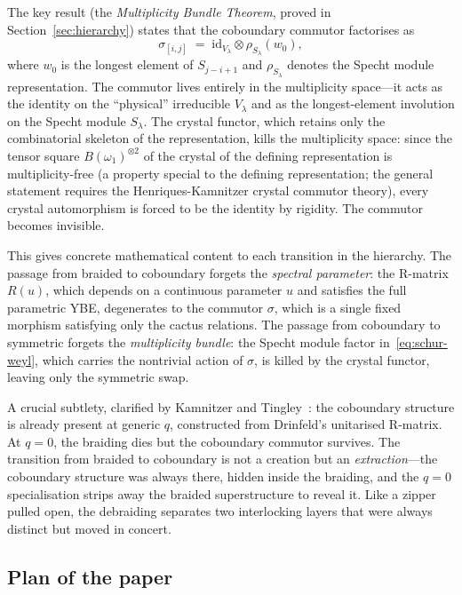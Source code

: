 The key result (the \emph{Multiplicity Bundle Theorem}, proved in
Section~\ref{sec:hierarchy}) states that the coboundary commutor factorises as
\begin{equation}\label{eq:commutor}
  \sigma_{[i,j]} \;=\; \mathrm{id}_{V_\lambda} \otimes \rho_{S_\lambda}(w_0),
\end{equation}
where $w_0$ is the longest element of $S_{j-i+1}$ and $\rho_{S_\lambda}$
denotes the Specht module representation.  The commutor lives entirely in the
multiplicity space---it acts as the identity on the ``physical'' irreducible
$V_\lambda$ and as the longest-element involution on the Specht module
$S_\lambda$.  The crystal functor, which retains only the combinatorial skeleton
of the representation, kills the multiplicity space: since the tensor square
$B(\omega_1)^{\otimes 2}$ of the crystal of the defining representation is
multiplicity-free (a property special to the defining representation; the
general statement requires the Henriques-Kamnitzer crystal commutor theory),
every crystal automorphism is forced to be the identity by rigidity.  The
commutor becomes invisible.

This gives concrete mathematical content to each transition in the hierarchy.
The passage from braided to coboundary forgets the \emph{spectral parameter}:
the R-matrix $R(u)$, which depends on a continuous parameter $u$ and satisfies
the full parametric YBE, degenerates to the commutor $\sigma$, which is a
single fixed morphism satisfying only the cactus relations.  The passage from
coboundary to symmetric forgets the \emph{multiplicity bundle}: the Specht
module factor in~\eqref{eq:schur-weyl}, which carries the nontrivial action
of $\sigma$, is killed by the crystal functor, leaving only the symmetric
swap.

A crucial subtlety, clarified by Kamnitzer and
Tingley~\cite{kamnitzer-tingley-2007}: the coboundary structure is already
present at generic $q$, constructed from Drinfeld's unitarised R-matrix.
At $q = 0$, the braiding dies but the coboundary commutor survives.
The transition from braided to coboundary is not a creation but an
\emph{extraction}---the coboundary structure was always there, hidden inside
the braiding, and the $q = 0$ specialisation strips away the braided
superstructure to reveal it.  Like a zipper pulled open, the debraiding
separates two interlocking layers that were always distinct but moved in
concert.

\subsection*{Plan of the paper}

